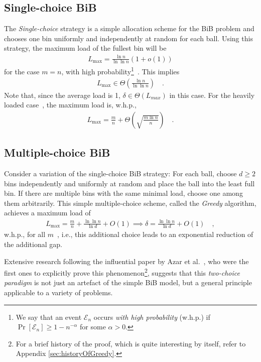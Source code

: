 \documentclass[a4paper,12pt]{article}
\newcommand\load{L_{\mathrm{max}}}
\begin{document}
\subsection{Single-choice BiB}
\label{sec:single-choice}
The \emph{Single-choice} strategy is a simple allocation scheme for the BiB problem and chooses one bin uniformly and independently at random for each ball. Using this strategy, the maximum load of the fullest bin will be
\begin{align*}
\load = \frac{\ln n}{\ln \ln n}  \left(1 + o\left(1\right)\right)
\end{align*}
for the case $m=n$, with high probability\footnote{We say that an event $\mathcal E_n$ occurs \emph{with high probability} (w.h.p.) if $\Pr\left[\mathcal E_n \right] \geq 1 - n^{-\alpha}$ for some $\alpha > 0$.}~\cite{RS98}. This implies
\begin{align*}
\load\in \Theta\left(\frac{\ln n}{\ln \ln n}\right)\quad .
\end{align*}
Note that, since the average load is 1, $\delta \in \Theta\left( L_{max} \right)$ in this case. For the heavily loaded case~\cite{RS98}, the maximum load is, w.h.p.,
\begin{align*}
\load = \frac{m}{n} + \Theta\left(\sqrt{\frac{m  \ln n}{n}}\right)\quad .
\end{align*}

\subsection{Multiple-choice BiB}
Consider a variation of the  single-choice BiB strategy: For each ball, choose $d \geq 2$ bins independently and uniformly at random and place the ball into the least full bin. If there are multiple bins with the same minimal load, choose one among them arbitrarily. This simple multiple-choice scheme, called the \emph{Greedy} algorithm, achieves a maximum load of
\begin{align*}
\load = \frac{m}{n}+\frac{\ln \ln n}{\ln d} + O(1) \implies \delta = \frac{\ln \ln n}{\ln d} + O(1) \quad ,
\end{align*}
w.h.p., for all $m$~\cite{ABKU99, BCSV06}, i.e., this additional choice leads to an exponential reduction of the additional gap. 
\begin{comment}
Curiously, the exponential decrease in the gap is already achieved having just two choices (that is, $d=2$). Each additional choice decreases the bound for the maximum gap by just a constant factor~\cite{MRS01}. 
\end{comment}
Extensive research following the influential paper by Azar et al.~\cite{ABKU99}, who were the first ones to explicitly prove this phenomenon\footnote{For a brief history of the proof, which is quite interesting by itself, refer to Appendix \ref{sec:historyOfGreedy}.}, suggests that this \emph{two-choice paradigm} is not just an artefact of the simple BiB model, but a general principle applicable to a variety of problems. 
\end{document}
